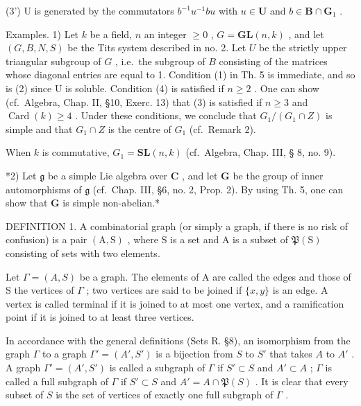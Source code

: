 (3') U is generated by the commutators \(b^{-1}u^{-1}bu\) with \(u \in \mathbf{U}\) and \(b \in \mathbf{B} \cap \mathbf{G}_1\) .

Examples. 1) Let \(k\) be a field, \(n\) an integer \(\geqslant 0\) , \(G = \mathbf{GL}(n, k)\) , and let \((G, B, N, S)\) be the Tits system described in no. 2. Let \(U\) be the strictly upper triangular subgroup of \(G\) , i.e.~the subgroup of \(B\) consisting of the matrices whose diagonal entries are equal to 1. Condition (1) in Th. 5 is immediate, and so is (2) since U is soluble. Condition (4) is satisfied if \(n \geqslant 2\) . One can show (cf.~Algebra, Chap. II, §10, Exerc. 13) that (3) is satisfied if \(n \geqslant 3\) and \(\operatorname{Card}(k) \geqslant 4\) . Under these conditions, we conclude that \(G_{1}/(G_{1} \cap Z)\) is simple and that \(G_{1} \cap Z\) is the centre of \(G_{1}\) (cf.~Remark 2).

When \(k\) is commutative, \(G_1 = \mathbf{SL}(n,k)\) (cf.~Algebra, Chap. III, § 8, no. 9).

*2) Let \(\mathfrak{g}\) be a simple Lie algebra over \(\mathbf{C}\) , and let \(\mathbf{G}\) be the group of inner automorphisms of \(\mathfrak{g}\) (cf.~Chap. III, §6, no. 2, Prop. 2). By using Th. 5, one can show that \(\mathbf{G}\) is simple non-abelian.*



DEFINITION 1. A combinatorial graph (or simply a graph, if there is no risk of confusion) is a pair \((\mathrm{A},\mathrm{S})\) , where \(\mathrm{S}\) is a set and \(\mathrm{A}\) is a subset of \(\mathfrak{P}(\mathrm{S})\) consisting of sets with two elements.

Let \(\Gamma = (A, S)\) be a graph. The elements of A are called the edges and those of S the vertices of \(\Gamma\) ; two vertices are said to be joined if \(\{x, y\}\) is an edge. A vertex is called terminal if it is joined to at most one vertex, and a ramification point if it is joined to at least three vertices.

In accordance with the general definitions (Sets R. §8), an isomorphism from the graph \(\Gamma\) to a graph \(\Gamma' = (A', S')\) is a bijection from \(S\) to \(S'\) that takes \(A\) to \(A'\) . A graph \(\Gamma' = (A', S')\) is called a subgraph of \(\Gamma\) if \(S' \subset S\) and \(A' \subset A\) ; \(\Gamma\) is called a full subgraph of \(\Gamma\) if \(S' \subset S\) and \(A' = A \cap \mathfrak{P}(S)\) . It is clear that every subset of \(S\) is the set of vertices of exactly one full subgraph of \(\Gamma\) .

